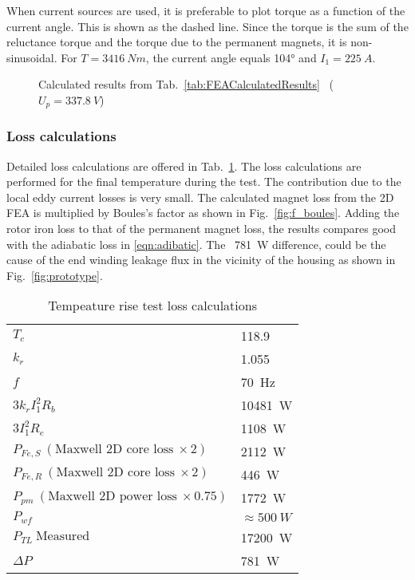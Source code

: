 When current sources are used, it is preferable to plot torque as a function of the current angle. This is shown as the dashed line. Since the torque is the sum of the  reluctance torque and the torque due to the permanent magnets, it is non-sinusoidal. For $T=\SI{3416}{Nm}$, the current angle equals \ang{104} and $I_1=\SI{225}{A}$.
\begin{figure}[htbp]
	\centering
		
	\caption{Calculated results from Tab.~\ref{tab:FEACalculatedResults}~%
	($U_p = \SI{337.8}{V}$)}
	\label{fig:heatrun_calulated}
\end{figure}

\subsubsection{Loss calculations}
Detailed loss calculations are offered in Tab.~\ref{tab:TempRiseLossCalculations}. The loss calculations are performed for the final temperature during the test. The contribution due to the local eddy current losses is very small. The calculated magnet loss from the 2D FEA is multiplied by Boules's factor as shown in Fig.~\ref{fig:f_boules}. Adding the rotor iron loss to that of the permanent magnet loss, the results compares good with the adiabatic loss in \eqref{eqn:adibatic}. The~%
\SI{781}{W} difference, could be the cause of the end winding leakage flux in the vicinity of the housing as shown in Fig.~\ref{fig:prototype}.  
\begin{table}[htbp]
	\centering
	\caption{Tempeature rise test loss calculations}
		\begin{tabular}{ll}
		\hline
		$T_c$                                 & \SI{118.9}{\degC}   \\
		$k_r$                                 & \num{1.055}         \\
		$f$                                   & \SI{70}{Hz}         \\
		$3k_rI_{1}^{2}R_b$                    & \SI{10481}{W}       \\
		$3I_{1}^{2}R_e$                       & \SI{1108}{W}        \\	
		$P_{Fe,S}\: (\mbox{Maxwell 2D core loss}\:\times 2)$    & \SI{2112}{W} \\
		$P_{Fe,R}\: (\mbox{Maxwell 2D core loss}\:\times 2)$    & \SI{446}{W}  \\
		$P_{pm}\: (\mbox{Maxwell 2D power loss}\:\times 0.75)$  & \SI{1772}{W} \\
		$P_{wf}$                              & $\approx \SI{500}{W}$  \\
		\hline
		$P_{TL}\: \mbox{Measured}$            & \SI{17200}{W}          \\
		\hline
		\hline
		$\Delta P$                            & \SI{781}{W}            \\
	  \hline
	\end{tabular}
	\label{tab:TempRiseLossCalculations}
\end{table}

